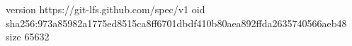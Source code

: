 version https://git-lfs.github.com/spec/v1
oid sha256:973a85982a1775ed8515ca8ff6701dbdf410b80aea892ffda2635740566aeb48
size 65632
